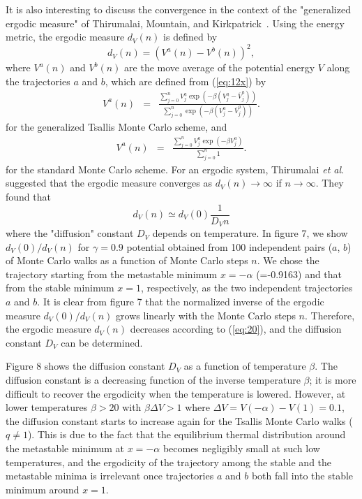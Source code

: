 It is also interesting to discuss the convergence in the context of
the "generalized ergodic measure" of Thirumalai, Mountain, and
Kirkpatrick~\cite{TMK,AS3}. Using the energy metric, the ergodic measure
$d_{V}(n)$ is defined by
\begin{equation}
d_{V}(n)=\left(V^{a}(n)-V^{b}(n)\right)^{2},
\label{eq:18}
\end{equation}
where $V^{a}(n)$ and $V^{b}(n)$ are the move average of the potential
energy $V$ along the trajectories $a$ and $b$, which
are defined from (\ref{eq:12x}) by
\begin{eqnarray}
V^{a}(n)&=&\frac{\sum_{j=0}^{n} V_{j}^{a} \exp\left(-\beta\left(V_{j}^{a}-  \overline{V}_{j}^{a}\right)\right)}
{\sum_{j=0}^{n} \exp\left(-\beta\left(V_{j}^{a}-
\overline{V}_{j}^{a}\right)\right)}.
\label{eq:19}
\end{eqnarray}
for the generalized Tsallis Monte Carlo scheme, and
\begin{eqnarray}
V^{a}(n)&=&\frac{\sum_{j=0}^{n} V_{j}^{a} \exp\left(-\beta V_{j}^{a}\right)}
{\sum_{j=0}^{n}1}.
\label{eq:19x}
\end{eqnarray}
for the standard Monte Carlo scheme.
For an ergodic system, Thirumalai {\it et al}.~\cite{TMK} suggested that
the ergodic measure converges as $d_{V}(n)\rightarrow \infty$ if
$n\rightarrow \infty$. They found that
\begin{equation}
d_{V}(n)\simeq d_{V}(0)\frac{1}{D_{V}n}
\label{eq:20}
\end{equation}
where the "diffusion" constant $D_{V}$ depends on temperature. In figure
7, we show $d_{V}(0)/d_{V}(n)$ for $\gamma=0.9$ potential obtained from 100
independent pairs ($a$, $b$) of Monte Carlo walks as a function of Monte Carlo
steps $n$. We chose the trajectory starting from the metastable minimum
$x=-\alpha$ (=-0.9163) and that from the stable minimum $x=1$,
respectively, as the two independent trajectories $a$ and $b$. It is
clear from figure 7 that the normalized inverse of the ergodic measure
$d_{V}(0)/d_{V}(n)$ grows linearly with the Monte Carlo steps $n$.
Therefore, the ergodic measure $d_{V}(n)$ decreases according to
(\ref{eq:20}), and the diffusion constant $D_{V}$ can be determined.

Figure 8 shows the diffusion constant $D_{V}$ as a function of temperature
$\beta$. The diffusion constant is a decreasing function of the inverse
temperature $\beta$; it is more difficult to recover the ergodicity when
the temperature is lowered. However, at lower temperatures $\beta>20$ with
$\beta\Delta V>1$ where $\Delta V=V(-\alpha)-V(1)=0.1$, the diffusion
constant starts to increase again for the Tsallis Monte Carlo walks ($q\neq
1$). This is due to the fact that the equilibrium thermal distribution
around the metastable minimum at $x=-\alpha$ becomes negligibly small at
such low temperatures, and the ergodicity of the trajectory among the
stable and the metastable minima is
irrelevant once trajectories $a$ and $b$ both fall into the stable
minimum around $x=1$.

